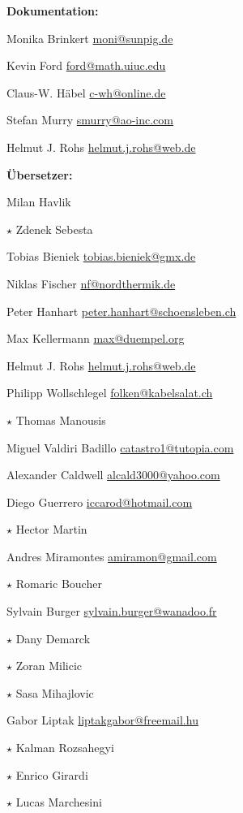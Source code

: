 \vspace{1em}
{\large\bf Dokumentation:}
\begin{compactitem}
\item Monika Brinkert \url{moni@sunpig.de}
\item Kevin Ford \url{ford@math.uiuc.edu}
\item Claus-W. Häbel \url{c-wh@online.de}
\item Stefan Murry \url{smurry@ao-inc.com}
\item Helmut J. Rohs \url{helmut.j.rohs@web.de}
\end{compactitem}

\vspace{1em}
{\large\bf Übersetzer:}
\begin{compactitem}
\item Milan Havlik
\item$\star$  Zdenek Sebesta
\item Tobias Bieniek \url{tobias.bieniek@gmx.de}
\item Niklas Fischer \url{nf@nordthermik.de}
\item Peter Hanhart \url{peter.hanhart@schoensleben.ch}
\item Max Kellermann \url{max@duempel.org}
\item Helmut J. Rohs \url{helmut.j.rohs@web.de}
\item Philipp Wollschlegel \url{folken@kabelsalat.ch}
\item$\star$  Thomas Manousis
\item Miguel Valdiri Badillo \url{catastro1@tutopia.com}
\item Alexander Caldwell \url{alcald3000@yahoo.com}
\item Diego Guerrero \url{iccarod@hotmail.com}
\item$\star$  Hector Martin
\item Andres Miramontes \url{amiramon@gmail.com}
\item$\star$  Romaric Boucher
\item Sylvain Burger \url{sylvain.burger@wanadoo.fr}
\item$\star$  Dany Demarck
\item$\star$  Zoran Milicic
\item$\star$  Sasa Mihajlovic
\item Gabor Liptak \url{liptakgabor@freemail.hu}
\item$\star$  Kalman Rozsahegyi
\item$\star$  Enrico Girardi
\item$\star$  Lucas Marchesini

\end{compactitem}
